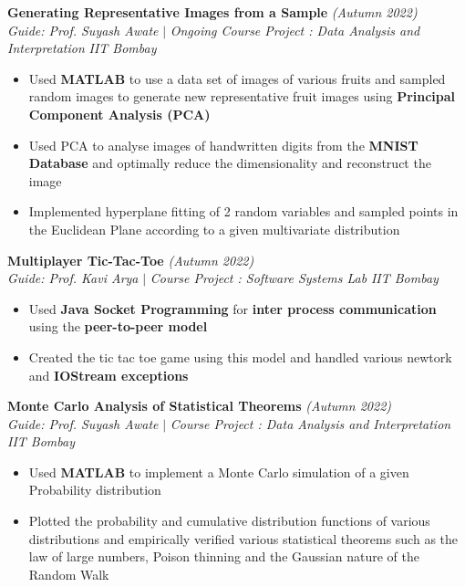 \documentclass[a4paper,10pt]{article}
\begin{document}
\vspace{\baselineskip}
\vspace{-10pt}
\noindent\textbf{\large Generating Representative Images from a Sample} \hfill{\sl \small (Autumn 2022)}\\
{\it Guide: Prof. Suyash Awate} $|$ {\it Ongoing Course Project : Data Analysis and Interpretation } \hfill{\it IIT Bombay}
\vspace{-3pt}
\begin{itemize}[itemsep = -0.65 mm, leftmargin=*]
    \item Used \textbf{MATLAB} to use a data set of images of various fruits and sampled random images to generate new
          representative fruit images using \textbf{Principal Component Analysis (PCA)}
    \item Used PCA to analyse images of handwritten digits from the \textbf{MNIST Database} and optimally reduce the
          dimensionality and reconstruct the image
    \item Implemented hyperplane fitting of 2 random variables and sampled points in the Euclidean Plane according to
          a given multivariate distribution
\end{itemize}
\vspace{\baselineskip}
\vspace{-10pt}
\noindent\textbf{\large Multiplayer Tic-Tac-Toe} \hfill{\sl \small (Autumn 2022)}\\
{\it Guide: Prof. Kavi Arya} $|$ {\it Course Project : Software Systems Lab } \hfill{\it IIT Bombay}\\
\vspace{-15pt}
\begin{itemize}[itemsep = -0.65 mm, leftmargin=*]
    \item Used \textbf{Java Socket Programming} for \textbf{inter process communication} using the \textbf{peer-to-peer model}
    \item Created the tic tac toe game using this model and handled various newtork and \textbf{IOStream exceptions}
\end{itemize}
\pagebreak
\vspace{\baselineskip}
\vspace{-10pt}
\noindent\textbf{\large Monte Carlo Analysis of Statistical Theorems} \hfill{\sl \small (Autumn 2022)}\\
{\it Guide: Prof. Suyash Awate} $|$ {\it Course Project : Data Analysis and Interpretation } \hfill{\it IIT Bombay}
\vspace{-3pt}
\begin{itemize}[itemsep = -0.65 mm, leftmargin=*]
    \item Used \textbf{MATLAB} to implement a Monte Carlo simulation of a given Probability distribution
    \item Plotted the probability and cumulative distribution functions of various distributions and empirically verified various statistical theorems such as the law of large numbers, Poison thinning and the
          Gaussian nature of the Random Walk
\end{itemize}
\end{document}
